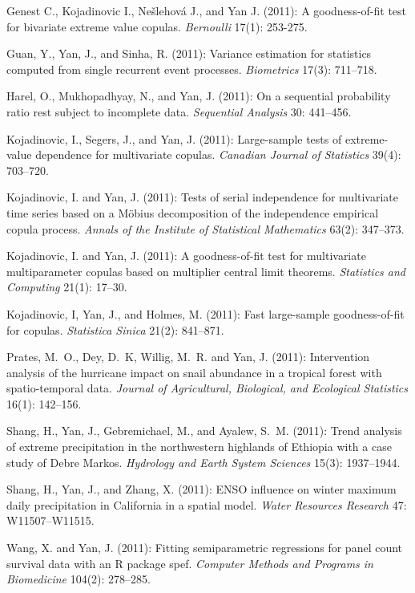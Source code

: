 \documentclass[Statistics]{vita}
\begin{document}
\begin{vita}
\begin{Publications}
\begin{RefereedJournalArticles}
  \item Genest C., Kojadinovic I., Ne\v{s}lehov\'a J., and Yan J. (2011): A goodness-of-fit test for bivariate extreme value copulas. {\em Bernoulli\/} 17(1): 253-275.
  \item Guan, Y., Yan, J., and Sinha, R. (2011): Variance estimation for statistics computed from single recurrent event processes. {\em Biometrics\/} 17(3): 711--718.
  \item Harel, O., Mukhopadhyay, N., and Yan, J. (2011): On a sequential probability ratio rest subject to incomplete data. {\em Sequential Analysis\/} 30: 441--456.
  \item Kojadinovic, I., Segers, J., and Yan, J. (2011): Large-sample tests of extreme-value dependence for multivariate copulas. {\em Canadian Journal of Statistics\/} 39(4): 703--720.
  \item Kojadinovic, I. and Yan, J. (2011): Tests of serial independence for multivariate time series based on a {M\"obius} decomposition of the independence empirical copula process. {\em Annals of the Institute of Statistical Mathematics\/} 63(2): 347--373.
  \item Kojadinovic, I. and Yan, J. (2011): A goodness-of-fit test for multivariate multiparameter copulas based on multiplier central limit theorems. {\em Statistics and Computing\/} 21(1): 17--30.
  \item Kojadinovic, I, Yan, J., and Holmes, M. (2011): Fast large-sample goodness-of-fit for copulas. {\em Statistica Sinica\/} 21(2): 841--871.
  \item *Prates, M.~O., Dey, D.~K, Willig, M.~R. and Yan, J. (2011): Intervention analysis of the hurricane impact on snail abundance in a tropical forest with spatio-temporal data.  {\em Journal of Agricultural, Biological, and Ecological Statistics\/} 16(1): 142--156.
  \item *Shang, H., Yan, J., Gebremichael, M., and Ayalew, S.~M. (2011): Trend analysis of extreme precipitation in the northwestern highlands of Ethiopia with a case study of Debre Markos. {\em Hydrology and Earth System Sciences\/} 15(3): 1937--1944.
  \item *Shang, H., Yan, J., and Zhang, X. (2011): ENSO influence on winter maximum daily precipitation in California in a spatial model. {\em Water Resources Research\/} 47: W11507--W11515.
  \item *Wang, X. and Yan, J. (2011): Fitting semiparametric regressions for panel count survival data with an {R} package {spef}. {\em Computer Methods and Programs in Biomedicine\/} 104(2): 278--285.

\end{RefereedJournalArticles}
\end{Publications}
\end{vita}
\end{document}

